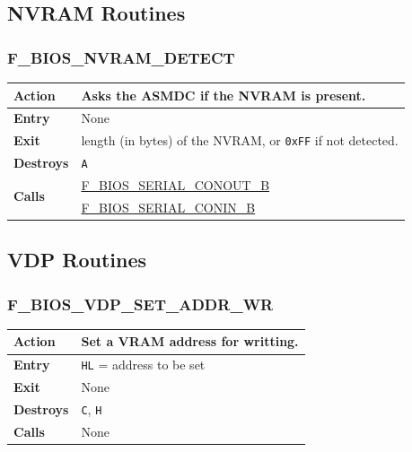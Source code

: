 \documentclass[a4paper,11pt]{article}
\begin{document}
    \subsection{NVRAM Routines}

        \subsubsection{F\_BIOS\_NVRAM\_DETECT}
        \label{func:fbiosnvramdetect}
        \begin{tabular}{l p{9cm}}
            \hline\textbf{Action}
            & Asks the \textbf{ASMDC} if the NVRAM is present. \\
            \hline\textbf{Entry} & None \\
            \hline\textbf{Exit} & length (in bytes) of the NVRAM, or
            \texttt{0xFF} if not detected.\\
            \hline\textbf{Destroys} & \texttt{A} \\
            \hline\multirow[t]{2}{4em}{\textbf{Calls}}
            & \hyperref[func:fbiosserialconoutb]{F\_BIOS\_SERIAL\_CONOUT\_B}\\
            & \hyperref[func:fbiosserialconinb]{F\_BIOS\_SERIAL\_CONIN\_B}\\
            \hline
        \end{tabular}

    \subsection{VDP Routines}

        \subsubsection{F\_BIOS\_VDP\_SET\_ADDR\_WR}
        \label{func:fbiosvdpsetaddrwr}
        \begin{tabular}{l p{9cm}}
            \hline\textbf{Action}
            & Set a \textbf{VRAM} address for writting. \\
            \hline\textbf{Entry} & \texttt{HL} = address to be set\\
            \hline\textbf{Exit} & None\\
            \hline\textbf{Destroys} & \texttt{C}, \texttt{H} \\
            \hline\textbf{Calls} & None\\
            \hline
        \end{tabular}
\end{document}
